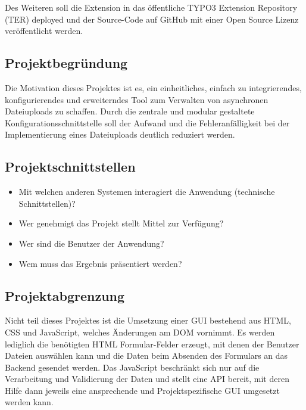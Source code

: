 Des Weiteren soll die Extension in das öffentliche TYPO3 Extension Repository (TER) deployed und der Source-Code auf GitHub mit einer Open Source Lizenz veröffentlicht werden. 


\subsection{Projektbegründung} 
\label{sec:Projektbegruendung}
Die Motivation dieses Projektes ist es, ein einheitliches, einfach zu integrierendes, konfigurierendes und erweiterndes Tool zum Verwalten von asynchronen Dateiuploads zu schaffen. Durch die zentrale und modular gestaltete Konfigurationsschnittstelle soll der Aufwand und die Fehleranfälligkeit bei der Implementierung eines Dateiuploads deutlich reduziert werden.


\subsection{Projektschnittstellen} 
\label{sec:Projektschnittstellen}
\begin{itemize}
	\item Mit welchen anderen Systemen interagiert die Anwendung (technische Schnittstellen)?
	\item Wer genehmigt das Projekt \bzw stellt Mittel zur Verfügung? 
	\item Wer sind die Benutzer der Anwendung?
	\item Wem muss das Ergebnis präsentiert werden?
\end{itemize}


\subsection{Projektabgrenzung} 
\label{sec:Projektabgrenzung}
Nicht teil dieses Projektes ist die Umsetzung einer GUI bestehend aus HTML, CSS und JavaScript, welches Änderungen am DOM vornimmt. Es werden lediglich die benötigten HTML Formular-Felder erzeugt, mit denen der Benutzer Dateien auswählen kann und die Daten beim Absenden des Formulars an das Backend gesendet werden. Das JavaScript beschränkt sich nur auf die Verarbeitung und Validierung der Daten und stellt eine API bereit, mit deren Hilfe dann jeweils eine ansprechende und Projektspezifische GUI umgesetzt werden kann.
